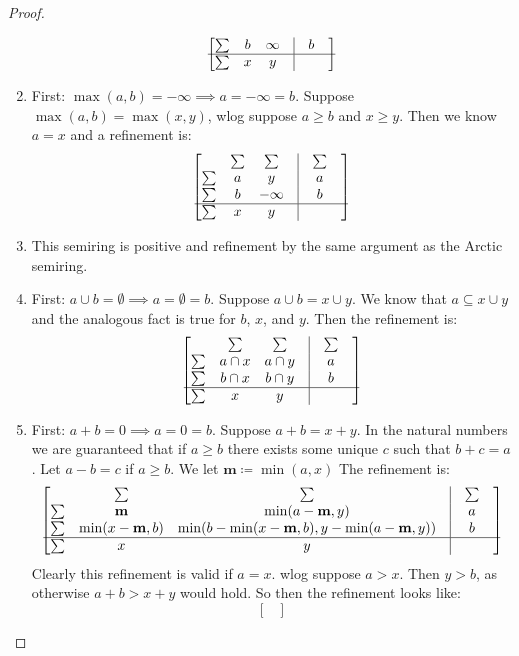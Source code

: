 \documentclass[a4paper,UKenglish,cleveref, autoref, thm-restate]{lipics-v2021}
\theoremstyle{plain}\newtheoremrep{thm}{Theorem}[section]
\begin{document}
\begin{toappendix}
\begin{proof}
\begin{enumerate}
$$\begin{bmatrix}
					\sum&b & \infty& \vline & b \\
					\hline
					\sum&x & y & \vline& & 
				\end{bmatrix}
				$$
				\item First: $\max(a,b) = -\infty \implies a = -\infty = b$. Suppose $\max(a,b) = \max(x,y)$, wlog suppose $a\geq b$ and $x\geq y$. Then we know $a=x$ and a refinement is:
				$$
				\begin{bmatrix}
					&\sum & \sum &\vline & \sum \\
					\sum&a & y& \vline & a \\
					\sum&b & -\infty& \vline & b \\
					\hline
					\sum&x & y & \vline& & 
				\end{bmatrix}
				$$
				\item This semiring is positive and refinement by the same argument as the Arctic semiring.
				\item First: $a \cup b = \emptyset \implies a = \emptyset = b$. Suppose $a \cup b = x\cup y$. We know that $a \subseteq x\cup y$ and the analogous fact is true for $b$, $x$, and $y$. Then the refinement is: 
				$$
				\begin{bmatrix}
					&\sum & \sum &\vline & \sum \\
					\sum&a\cap x & a \cap y& \vline & a \\
					\sum&b\cap x & b\cap y& \vline & b \\
					\hline
					\sum&x & y & \vline& & 
				\end{bmatrix}
				$$
				\item First: $a+b = 0 \implies a = 0 = b$. Suppose $a + b = x + y$. In the natural numbers we are guaranteed that if $a\geq b$ there exists some unique $c$ such that $b+c = a$. Let $a-b = c$ if $a\geq b$. We let $\textbf{m} \coloneq \min(a, x)$ The refinement is:
				$$
				\begin{bmatrix}
					&\sum & \sum &\vline & \sum \\
					\sum&\textbf{m} & \min(a-\textbf{m},y)& \vline & a \\
					\sum&\min(x-\textbf{m}, b) & \min(b-\min(x-\textbf{m}, b), y-\min(a-\textbf{m},y))& \vline & b \\
					\hline
					\sum&x & y & \vline& & 
				\end{bmatrix}
				$$
				Clearly this refinement is valid if $a=x$. wlog suppose $a > x$. Then $y > b$, as otherwise $a+b > x+y$ would hold. So then the refinement looks like: 
				$$
				\begin{bmatrix}

\end{bmatrix}$$
\end{enumerate}
\end{proof}
\end{toappendix}
\end{document}
